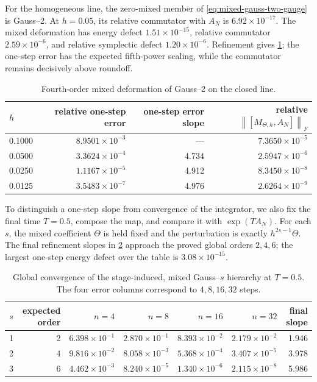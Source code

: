 \documentclass[11pt,a4paper]{article}
\newcommand{\norm}[1]{\left\lVert #1\right\rVert}
\begin{document}
For the homogeneous line, the zero-mixed member of
\cref{eq:mixed-gauss-two-gauge} is Gauss--2.  At \(h=0.05\), its relative
commutator with \(A_N\) is \(6.92\times10^{-17}\).  The mixed deformation
has energy defect \(1.51\times10^{-15}\), relative commutator
\(2.59\times10^{-6}\), and relative symplectic defect
\(1.20\times10^{-6}\).  Refinement gives \cref{tab:mixed-gauss-order};
the one-step error has the expected fifth-power scaling, while the
commutator remains decisively above roundoff.

\begin{table}[htbp]
\centering
\caption{Fourth-order mixed deformation of Gauss--2 on the closed line.}
\label{tab:mixed-gauss-order}
\begin{tabular}{@{}lrrr@{}}
\toprule
\(h\) & relative one-step error & one-step error slope
& relative \(\norm{[M_{\Theta,h},A_N]}_F\) \\ \midrule
0.1000 & \(8.9501\times10^{-3}\) & --- & \(7.3650\times10^{-5}\) \\
0.0500 & \(3.3624\times10^{-4}\) & 4.734 & \(2.5947\times10^{-6}\) \\
0.0250 & \(1.1167\times10^{-5}\) & 4.912 & \(8.3450\times10^{-8}\) \\
0.0125 & \(3.5483\times10^{-7}\) & 4.976 & \(2.6264\times10^{-9}\) \\
\bottomrule
\end{tabular}
\end{table}

To distinguish a one-step slope from convergence of the integrator, we
also fix the final time \(T=0.5\), compose the map, and compare it with
\(\exp(TA_N)\).  For each \(s\), the mixed coefficient \(\Theta\) is held
fixed and the perturbation is exactly \(h^{2s-1}\Theta\).  The final
refinement slopes in \cref{tab:gauss-hierarchy-global} approach the proved
global orders \(2,4,6\); the largest one-step energy defect over the table
is \(3.08\times10^{-15}\).

\begin{table}[H]
\centering
\caption{Global convergence of the stage-induced, mixed Gauss--\(s\) hierarchy
at \(T=0.5\).  The four error columns correspond to \(4,8,16,32\) steps.}
\label{tab:gauss-hierarchy-global}
\begin{tabular}{@{}crrrrrr@{}}
\toprule
\(s\) & expected order & \(n=4\) & \(n=8\) & \(n=16\) & \(n=32\)
& final slope \\ \midrule
1 & 2 & \(6.398\!\times10^{-1}\) & \(2.870\!\times10^{-1}\)
& \(8.393\!\times10^{-2}\) & \(2.179\!\times10^{-2}\) & 1.946\\
2 & 4 & \(9.816\!\times10^{-2}\) & \(8.058\!\times10^{-3}\)
& \(5.368\!\times10^{-4}\) & \(3.407\!\times10^{-5}\) & 3.978\\
3 & 6 & \(4.462\!\times10^{-3}\) & \(8.240\!\times10^{-5}\)
& \(1.340\!\times10^{-6}\) & \(2.115\!\times10^{-8}\) & 5.986\\
\bottomrule
\end{tabular}
\end{table}
\end{document}
